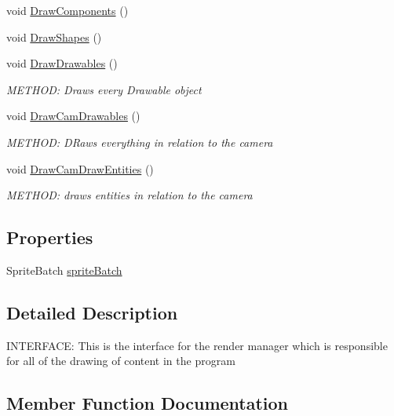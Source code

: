 \begin{DoxyCompactItemize}
\item 
void \hyperlink{a00458_a326852d43fb14fb872d856ff2c1d6fd9}{Draw\+Components} ()
\item 
void \hyperlink{a00458_af785d8e5292f1f8f89c47d300e2c7d67}{Draw\+Shapes} ()
\item 
void \hyperlink{a00458_ace0e8fa7ce70c3437fce1298b22bf195}{Draw\+Drawables} ()
\begin{DoxyCompactList}\small\item\em M\+E\+T\+H\+OD\+: Draws every Drawable object \end{DoxyCompactList}\item 
void \hyperlink{a00458_a9239479d4d4f220b334722e48acb5bc2}{Draw\+Cam\+Drawables} ()
\begin{DoxyCompactList}\small\item\em M\+E\+T\+H\+OD\+: D\+Raws everything in relation to the camera \end{DoxyCompactList}\item 
void \hyperlink{a00458_a521ac08ccb20d1dbe58ff906fc7c42a4}{Draw\+Cam\+Draw\+Entities} ()
\begin{DoxyCompactList}\small\item\em M\+E\+T\+H\+OD\+: draws entities in relation to the camera \end{DoxyCompactList}\end{DoxyCompactItemize}
\subsection*{Properties}
\begin{DoxyCompactItemize}
\item 
Sprite\+Batch \hyperlink{a00458_a4733e89074f5ed1383e2328021fb7dd3}{sprite\+Batch}
\end{DoxyCompactItemize}


\subsection{Detailed Description}
I\+N\+T\+E\+R\+F\+A\+CE\+: This is the interface for the render manager which is responsible for all of the drawing of content in the program 



\subsection{Member Function Documentation}
\mbox{\label{a00458_a85d74d22976a3d818b21cc856da85092}} 
